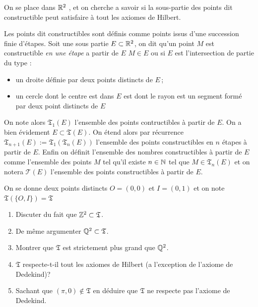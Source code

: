 \begin{exo}\label{exo-constructible}
On se place dans $\mathbb{R}^2$ , et on cherche a savoir si la sous-partie des points dit constructible peut satisfaire à tout les axiomes de Hilbert. 

Les points dit constructibles sont définis comme points issus d'une succession finie d'étapes. Soit une sous partie $E\subset \mathbb{R}^2$, on dit qu'un point $M$ est constructible \emph{en une étape} a partir de $E$ \ssi $M\in E$ ou si $E$ est l'intersection de partie du type :
\begin{itemize}[$\bullet$]
    \item un droite définie par deux points distincts de $E$\,;
    \item un cercle dont le centre est dans $E$ est dont le rayon est un segment formé par deux point distincts de $E$\,
\end{itemize} 
On note alors $\mathfrak{T}_1\left(E\right)$ l'ensemble des points contructibles à partir de $E$. On a bien évidement $E\subset \mathfrak{T}\left(E\right)$. On étend alors par récurrence $\mathfrak{T}_{n+1}\left(E\right):=\mathfrak{T}_1\left(\mathfrak{T}_n\left(E\right)\right)$ l'ensemble des points constructibles en $n$ étapes à partir de $E$. Enfin on définit l'ensemble des nombres constructibles à partir de $E$ comme l'ensemble des points $M$ tel qu'il existe $n\in\mathbb{N}$ tel que $M\in \mathfrak{T}_n\left(E\right)$ et on notera $\mathcal{T}\left(E\right)$ l'ensemble des points constructibles à partir de $E$.

On se donne deux points distincts $O=(0,0)$ et $I=(0,1)$ et on note $\mathfrak{T}\left(\{O,I\}\right)=\mathfrak{T}$
\begin{enumerate}
    \item Discuter du fait que $\mathbb{Z}^2 \subset \mathfrak{T}$.
    \item De même argumenter $\mathbb{Q}^2 \subset \mathfrak{T}$.
    \item Montrer que $\mathfrak{T}$ est strictement plus grand que $\mathbb{Q}^2$. 
    \item $\mathfrak{T}$ respecte-t-il tout les axiomes de Hilbert (a l'exception de l'axiome de Dedekind)? 
    \item Sachant que $(\pi,0)\notin \mathfrak{T}$ en déduire que $\mathfrak{T}$ ne respecte pas l'axiome de Dedekind. 
\end{enumerate}
\end{exo}

